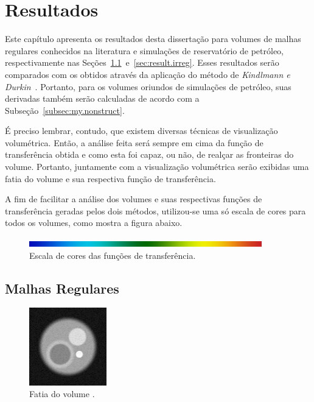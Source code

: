 
\chapter{Resultados}
\label{ch:result}

	Este capítulo apresenta os resultados desta dissertação para volumes de malhas regulares conhecidos na literatura e simulações de reservatório de petróleo, respectivamente nas Seções~\ref{sec:result.reg}~e~\ref{sec:result.irreg}. Esses resultados serão comparados com os obtidos através da aplicação do método de \textit{Kindlmann e Durkin}~\cite{gordon}. Portanto, para os volumes oriundos de simulações de petróleo, suas derivadas também serão calculadas de acordo com a Subseção~\ref{subsec:my.nonstruct}.
	
	É preciso lembrar, contudo, que existem diversas técnicas de visualização volumétrica. Então, a análise feita será sempre em cima da função de transferência obtida e como esta foi capaz, ou não, de realçar as fronteiras do volume. Portanto, juntamente com a visualização volumétrica serão exibidas uma fatia do volume e sua respectiva função de transferência.
	
	A fim de facilitar a análise dos volumes e suas respectivas funções de transferência geradas pelos dois métodos, utilizou-se uma só escala de cores para todos os volumes, como mostra a figura abaixo.

\begin{figure}[h]
	\centering
	\includegraphics[width=0.9\textwidth]{images/r_colorscale}
	\caption{Escala de cores das funções de transferência.}
\end{figure}
	
\section{Malhas Regulares}
\label{sec:result.reg}

\begin{figure}[h]
	\centering
	\includegraphics[width=0.3\textwidth]{images/r_3sphere_slice}
	\caption{Fatia do volume .}
\end{figure}

